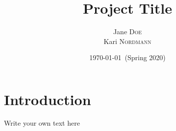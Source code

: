 \documentclass[11pt, a4paper]{article}
\title{Project Title}
\author{Jane \textsc{Doe}\\
Kari \textsc{Nordmann}}
\date{\today~(Spring 2020)}
\begin{document}


\section*{Introduction}

Write your own text here

\end{document}

